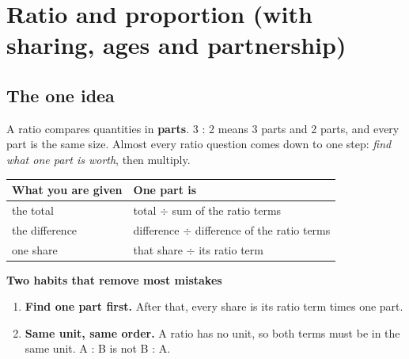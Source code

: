 \documentclass[11pt,a4paper]{article}
\let\oldsubsection\subsection
\renewcommand{\subsection}{\needspace{9\baselineskip}\oldsubsection}
\newcommand{\infobox}[2]{\par\medskip\noindent\begingroup\setlength{\fboxsep}{7pt}%
  \colorbox{codebg}{\parbox{\dimexpr\linewidth-14pt\relax}{\textbf{\color{ember}#1}\par\smallskip #2}}\endgroup\par\medskip}
\begin{document}
\clearpage
\section[Ratio and proportion (R1--R12)]{Ratio and proportion (with sharing, ages and partnership)}\label{ch:R}

\subsection*{The one idea}
A ratio compares quantities in \textbf{parts}. 3 : 2 means 3 parts and 2 parts, and every part is the same size. Almost every ratio question comes down to one step: \emph{find what one part is worth}, then multiply.

\begin{center}\small\renewcommand{\arraystretch}{1.18}\setlength{\tabcolsep}{9pt}
\begin{tabular}{@{}ll@{}}
\toprule
\textbf{\color{slate}What you are given} & \textbf{\color{slate}One part is} \\ \midrule
the total & total $\div$ sum of the ratio terms \\
the difference & difference $\div$ difference of the ratio terms \\
one share & that share $\div$ its ratio term \\
\bottomrule
\end{tabular}\end{center}

\infobox{Two habits that remove most mistakes}{
\begin{enumerate}
\item \textbf{Find one part first.} After that, every share is its ratio term times one part.
\item \textbf{Same unit, same order.} A ratio has no unit, so both terms must be in the same unit. A : B is not B : A.
\end{enumerate}}
\end{document}
